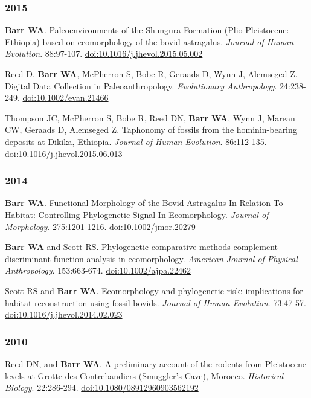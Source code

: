 \subsubsection*{2015}

\item  {\bfseries Barr WA}. Paleoenvironments of the Shungura Formation (Plio-Pleistocene: Ethiopia) based on ecomorphology of the bovid astragalus. \emph{Journal of Human Evolution}. 88:97-107. \href{http://dx.doi.org/10.1016/j.jhevol.2015.05.002}{doi:10.1016/j.jhevol.2015.05.002}

\item  Reed D, {\bfseries Barr WA}, McPherron S, Bobe R, Geraads D, Wynn J, Alemseged Z. Digital Data Collection in Paleoanthropology. \emph{Evolutionary Anthropology}. 24:238-249. \href{http://dx.doi.org/10.1002/evan.21466}{doi:10.1002/evan.21466}

\item  Thompson JC, McPherron S, Bobe R, Reed DN, {\bfseries Barr WA}, Wynn J, Marean CW, Geraads D, Alemseged Z. Taphonomy of fossils from the hominin-bearing deposits at Dikika, Ethiopia. \emph{Journal of Human Evolution}. 86:112-135. \href{http://dx.doi.org/10.1016/j.jhevol.2015.06.013}{doi:10.1016/j.jhevol.2015.06.013}

\subsubsection*{2014}

\item  {\bfseries Barr WA}. Functional Morphology of the Bovid Astragalus In Relation To Habitat: Controlling Phylogenetic Signal In Ecomorphology. \emph{Journal of Morphology}. 275:1201-1216. \href{http://dx.doi.org/10.1002/jmor.20279}{doi:10.1002/jmor.20279}

\item  {\bfseries Barr WA} and Scott RS. Phylogenetic comparative methods complement discriminant function analysis in ecomorphology. \emph{American Journal of Physical Anthropology}. 153:663-674. \href{http://dx.doi.org/10.1002/ajpa.22462}{doi:10.1002/ajpa.22462}

\item  Scott RS and {\bfseries Barr WA}. Ecomorphology and phylogenetic risk: implications for habitat reconstruction using fossil bovids. \emph{Journal of Human Evolution}. 73:47-57. \href{http://dx.doi.org/10.1016/j.jhevol.2014.02.023}{doi:10.1016/j.jhevol.2014.02.023}

\subsubsection*{2010}

\item  Reed DN, and {\bfseries Barr WA}. A preliminary account of the rodents from Pleistocene levels at Grotte des Contrebandiers (Smuggler's Cave), Morocco. \emph{Historical Biology}. 22:286-294. \href{http://dx.doi.org/10.1080/08912960903562192}{doi:10.1080/08912960903562192}




